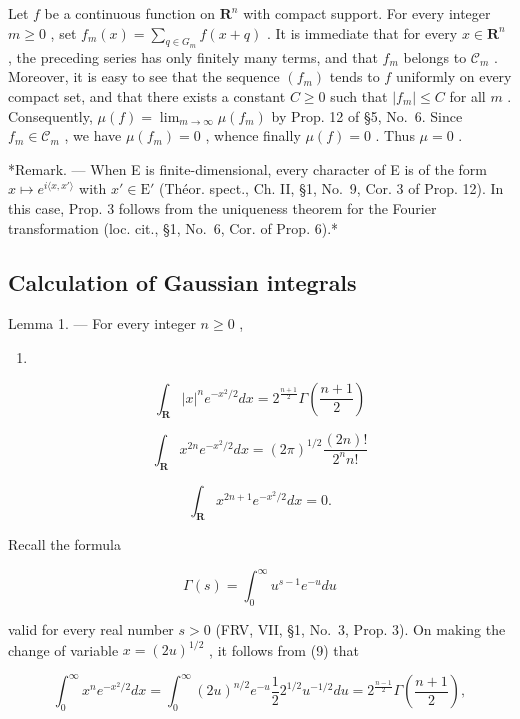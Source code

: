 Let \(f\) be a continuous function on \(\mathbf{R}^n\) with compact support. For every integer \(m \geqslant 0\) , set \(f_m(x) = \sum_{q \in G_m} f(x + q)\) . It is immediate that for every \(x \in \mathbf{R}^n\) , the preceding series has only finitely many terms, and that \(f_m\) belongs to \(\mathcal{C}_m\) . Moreover, it is easy to see that the sequence \((f_m)\) tends to \(f\) uniformly on every compact set, and that there exists a constant \(C \geqslant 0\) such that \(|f_m| \leqslant C\) for all \(m\) . Consequently, \(\mu(f) = \lim_{m \to \infty} \mu(f_m)\) by Prop. 12 of §5, No.~6. Since \(f_m \in \mathcal{C}_m\) , we have \(\mu(f_m) = 0\) , whence finally \(\mu(f) = 0\) . Thus \(\mu = 0\) .

*Remark. --- When E is finite-dimensional, every character of E is of the form \(x \mapsto e^{i\langle x,x' \rangle}\) with \(x' \in \mathrm{E}'\) (Théor. spect., Ch. II, §1, No.~9, Cor. 3 of Prop. 12). In this case, Prop. 3 follows from the uniqueness theorem for the Fourier transformation (loc. cit., §1, No.~6, Cor. of Prop. 6).*

\subsection{Calculation of Gaussian integrals}

Lemma 1. --- For every integer \(n \geqslant 0\) ,

\begin{enumerate}
\def\labelenumi{(\arabic{enumi})}
\setcounter{enumi}{5}
\tightlist
\item
\end{enumerate}

\[
\int_ {\mathbf {R}} | x | ^ {n} e ^ {- x ^ {2} / 2} d x = 2 ^ {\frac {n + 1}{2}} \Gamma \left(\frac {n + 1}{2}\right)\tag{7}
\]

\[
\int_ {\mathbf {R}} x ^ {2 n} e ^ {- x ^ {2} / 2} d x = (2 \pi) ^ {1 / 2} \frac {(2 n) !}{2 ^ {n} n !}\tag{8}
\]

\[
\int_ {\mathbf {R}} x ^ {2 n + 1} e ^ {- x ^ {2} / 2} d x = 0.
\]

Recall the formula

\[
\Gamma (s) = \int_ {0} ^ {\infty} u ^ {s - 1} e ^ {- u} d u\tag{9}
\]

valid for every real number \(s > 0\) (FRV, VII, §1, No.~3, Prop. 3). On making the change of variable \(x = (2u)^{1/2}\) , it follows from (9) that

\[
\int_ {0} ^ {\infty} x ^ {n} e ^ {- x ^ {2} / 2} d x = \int_ {0} ^ {\infty} (2 u) ^ {n / 2} e ^ {- u} \frac {1}{2} 2 ^ {1 / 2} u ^ {- 1 / 2} d u = 2 ^ {\frac {n - 1}{2}} \Gamma \left(\frac {n + 1}{2}\right),
\]

